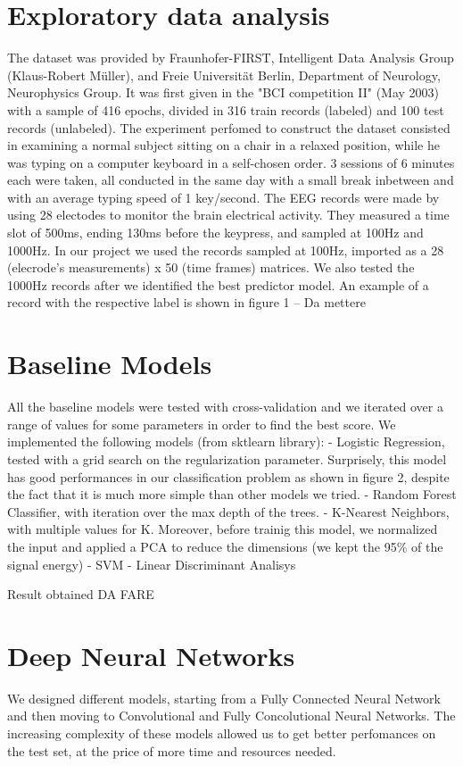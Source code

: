 \documentclass[10pt,conference,compsocconf]{IEEEtran}
\begin{document}
\section{Exploratory data analysis}
\label{sec:data-analysis}
The dataset was provided by Fraunhofer-FIRST, Intelligent Data Analysis Group (Klaus-Robert Müller), and Freie Universität Berlin, Department of Neurology, Neurophysics Group. It was first given in the "BCI competition II" (May 2003) with a sample of 416 epochs, divided in 316 train records (labeled) and 100 test records (unlabeled).
The experiment perfomed to construct the dataset consisted in examining a normal subject sitting on a chair in a relaxed position, while he was typing on a computer keyboard in a self-chosen order. 3 sessions of 6 minutes each were taken, all conducted in the same day with a small break inbetween and with an average typing speed of 1 key/second. The EEG records were made by using 28 electodes to monitor the brain electrical activity. They measured a time slot of 500ms, ending 130ms before the keypress, and sampled at 100Hz and 1000Hz. 
In our project we used the records sampled at 100Hz, imported as a 28 (elecrode's measurements) x 50 (time frames) matrices. We also tested the 1000Hz records after we identified the best predictor model.
An example of a record with the respective label is shown in figure 1 -- Da mettere


\section{Baseline Models}
\label{sec:baseline}
All the baseline models were tested with cross-validation and we iterated over a range of values for some parameters in order to find the best score.
We implemented the following models (from sktlearn library):
- Logistic Regression, tested with a grid search on the regularization parameter. Surprisely, this model has good performances in our classification problem as shown in figure 2, despite the fact that it is much more simple than other models we tried.
- Random Forest Classifier, with iteration over the max depth of the trees.
- K-Nearest Neighbors, with multiple values for K. Moreover, before trainig this model, we normalized the input and applied a PCA to reduce the dimensions (we kept the 95\% of the signal energy)
- SVM
- Linear Discriminant Analisys

Result obtained 
DA FARE

\section{Deep Neural Networks}
\label{sec:deep}
We designed different models, starting from a Fully Connected Neural Network and then moving to Convolutional and Fully Concolutional Neural Networks. The increasing complexity of these models allowed us to get better perfomances on the test set, at the price of more time and resources needed.
\end{document}
